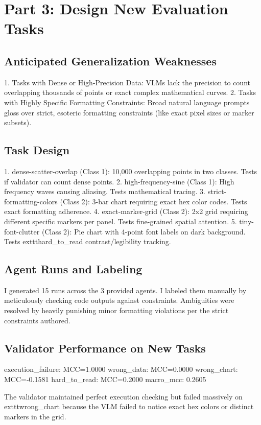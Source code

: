 \documentclass[11pt]{article}
\begin{document}
\section{Part 3: Design New Evaluation Tasks}

\subsection{Anticipated Generalization Weaknesses}
1. Tasks with Dense or High-Precision Data: VLMs lack the precision to count overlapping thousands of points or exact complex mathematical curves.
2. Tasks with Highly Specific Formatting Constraints: Broad natural language prompts gloss over strict, esoteric formatting constraints (like exact pixel sizes or marker subsets).

\subsection{Task Design}
1. dense-scatter-overlap (Class 1): 10,000 overlapping points in two classes. Tests if validator can count dense points.
2. high-frequency-sine (Class 1): High frequency waves causing aliasing. Tests mathematical tracing.
3. strict-formatting-colors (Class 2): 3-bar chart requiring exact hex color codes. Tests exact formatting adherence.
4. exact-marker-grid (Class 2): 2x2 grid requiring different specific markers per panel. Tests fine-grained spatial attention.
5. tiny-font-clutter (Class 2): Pie chart with 4-point font labels on dark background. Tests 	exttt{hard\_to\_read} contrast/legibility tracking.

\subsection{Agent Runs and Labeling}
I generated 15 runs across the 3 provided agents. I labeled them manually by meticulously checking code outputs against constraints. Ambiguities were resolved by heavily punishing minor formatting violations per the strict constraints authored.

\subsection{Validator Performance on New Tasks}
execution\_failure: MCC=1.0000
wrong\_data: MCC=0.0000
wrong\_chart: MCC=-0.1581
hard\_to\_read: MCC=0.2000
macro\_mcc: 0.2605

The validator maintained perfect execution checking but failed massively on 	exttt{wrong\_chart} because the VLM failed to notice exact hex colors or distinct markers in the grid.
\end{document}
